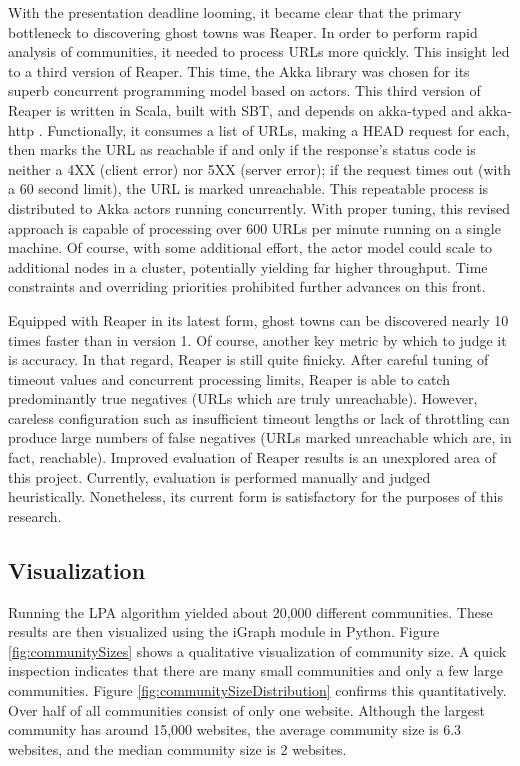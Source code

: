 \documentclass[conference]{IEEEtran}
\begin{document}
With the presentation deadline looming, it became clear that the primary bottleneck to discovering ghost towns was Reaper. In order to perform rapid analysis of communities, it needed to process URLs more quickly. This insight led to a third version of Reaper. This time, the Akka library was chosen for its superb concurrent programming model based on actors. This third version of Reaper is written in Scala, built with SBT, and depends on akka-typed \cite{akkaTyped} and akka-http \cite{akkaHttp}. Functionally, it consumes a list of URLs, making a HEAD request for each, then marks the URL as reachable if and only if the response's status code is neither a 4XX (client error) nor 5XX (server error); if the request times out (with a 60 second limit), the URL is marked unreachable. This repeatable process is distributed to Akka actors running concurrently. With proper tuning, this revised approach is capable of processing over 600 URLs per minute running on a single machine. Of course, with some additional effort, the actor model could scale to additional nodes in a cluster, potentially yielding far higher throughput. Time constraints and overriding priorities prohibited further advances on this front.

Equipped with Reaper in its latest form, ghost towns can be discovered nearly 10 times faster than in version 1. Of course, another key metric by which to judge it is accuracy. In that regard, Reaper is still quite finicky. After careful tuning of timeout values and concurrent processing limits, Reaper is able to catch predominantly true negatives (URLs which are truly unreachable). However, careless configuration such as insufficient timeout lengths or lack of throttling can produce large numbers of false negatives (URLs marked unreachable which are, in fact, reachable). Improved evaluation of Reaper results is an unexplored area of this project. Currently, evaluation is performed manually and judged heuristically. Nonetheless, its current form is satisfactory for the purposes of this research.

\subsection{Visualization}

Running the LPA algorithm yielded about 20,000 different communities. These results are then visualized using the iGraph module in Python. Figure \ref{fig:communitySizes} shows a qualitative visualization of community size. A quick inspection indicates that there are many small communities and only a few large communities. Figure \ref{fig:communitySizeDistribution} confirms this quantitatively. Over half of all communities consist of only one website. Although the largest community has around 15,000 websites, the average community size is 6.3 websites, and the median community size is 2 websites.
\end{document}
